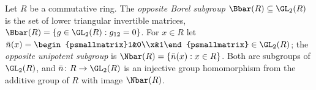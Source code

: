 Let $R$ be a commutative ring. The \emph{opposite Borel subgroup} $\Bbar(R)\subseteq\GL_2(R)$ is the set of lower
triangular invertible matrices, $\Bbar(R)=\{g\in\GL_2(R):g_{12}=0\}$. For $x\in R$ let
$\bar n(x)=\begin{psmallmatrix}1&0\\x&1\end{psmallmatrix}\in\GL_2(R)$; the \emph{opposite unipotent subgroup} is
$\Nbar(R)=\{\bar n(x):x\in R\}$. Both are subgroups of $\GL_2(R)$, and $\bar n\colon R\to\GL_2(R)$ is an injective
group homomorphism from the additive group of $R$ with image $\Nbar(R)$.
